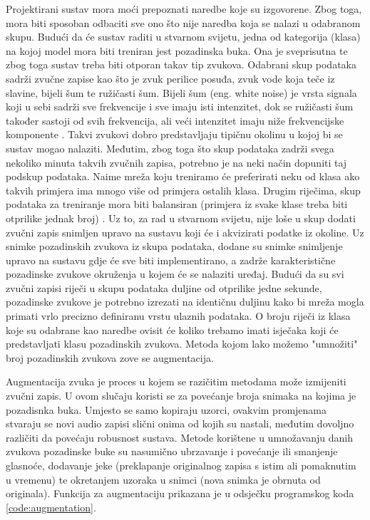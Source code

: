 Projektirani sustav mora moći prepoznati naredbe koje su izgovorene.
Zbog toga, mora biti sposoban odbaciti sve ono što nije naredba koja se
nalazi u odabranom skupu. Budući da će sustav raditi u stvarnom svijetu,
jedna od kategorija (klasa)
na kojoj model mora biti treniran jest pozadinska buka. Ona je sveprisutna te 
zbog toga sustav treba biti otporan takav tip zvukova. Odabrani skup podataka
sadrži zvučne zapise kao što je zvuk perilice posuđa, zvuk vode koja teče
iz slavine, bijeli šum te ružičasti šum. Bijeli šum (eng. white noise) je vrsta
signala koji u sebi sadrži sve frekvencije i sve imaju isti intenzitet,
dok se ružičasti šum također sastoji od svih frekvencija, ali veći intenzitet
imaju niže frekvencijske komponente \cite{noise}. Takvi zvukovi dobro predstavljaju
tipičnu okolinu u kojoj bi se sustav mogao nalaziti. Međutim, zbog toga što skup
podataka zadrži
svega nekoliko minuta takvih zvučnih zapisa, potrebno je na neki način dopuniti
taj podskup podataka. Naime mreža koju treniramo će preferirati neku od klasa
ako takvih primjera ima mnogo više od primjera ostalih klasa. Drugim riječima,
skup podataka za treniranje mora biti balansiran (primjera iz svake klase treba
biti otprilike jednak broj) \cite{balance}. Uz to, za rad u stvarnom svijetu, nije 
loše u skup
dodati zvučni zapis snimljen upravo na sustavu koji će i akvizirati podatke iz okoline.
Uz snimke pozadinskih zvukova iz skupa podataka, dodane su snimke snimljenje upravo
na sustavu gdje će sve biti implementirano, a zadrže karakteristične pozadinske
zvukove okruženja u kojem će se nalaziti uređaj. Budući da su svi zvučni zapisi 
riječi u skupu podataka duljine od otprilike jedne sekunde, pozadinske zvukove
je potrebno izrezati na identičnu duljinu kako bi mreža mogla primati vrlo 
precizno definiranu vrstu ulaznih podataka. O broju riječi iz klasa koje su odabrane 
kao naredbe ovisit će koliko trebamo imati isječaka koji će predstavljati
klasu pozadinskih zvukova. Metoda kojom lako možemo "umnožiti" broj pozadinskih 
zvukova zove se augmentacija.

Augmentacija zvuka je proces u kojem se razičitim metodama može izmijeniti 
zvučni zapis. U ovom slučaju koristi se za povećanje broja snimaka na kojima
je pozadisnka buka. Umjesto se samo kopiraju uzorci, ovakvim promjenama stvaraju
se novi audio zapisi slični onima od kojih su nastali, međutim dovoljno različiti 
da povećaju robusnost sustava. Metode korištene u umnožavanju danih zvukova
pozadinske buke su nasumično ubrzavanje i povećanje ili smanjenje glasnoće,
dodavanje jeke (preklapanje originalnog zapisa s istim ali pomaknutim u vremenu)
te okretanjem uzoraka u snimci (nova snimka je obrnuta od originala). Funkcija
za augmentaciju prikazana je u odsječku programskog koda \ref{code:augmentation}.


